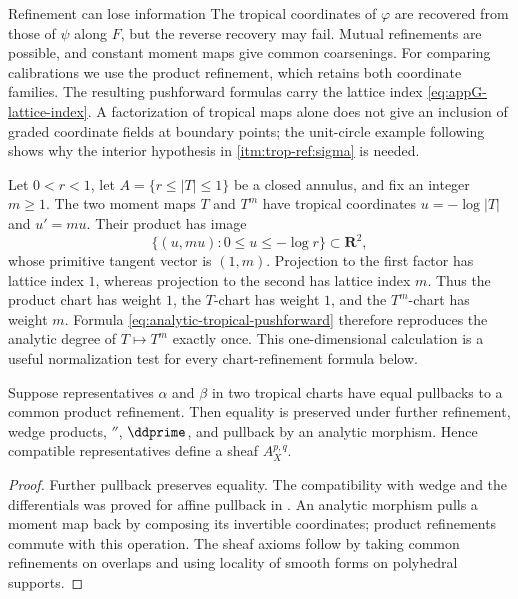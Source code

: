 \begin{warning}{Refinement can lose information}
The tropical coordinates of $\varphi$ are recovered from those of $\psi$
along $F$, but the reverse recovery may fail. Mutual refinements are
possible, and constant moment maps give common coarsenings. For comparing
calibrations we use the product refinement, which retains both coordinate
families. The resulting pushforward formulas carry the lattice index
\eqref{eq:appG-lattice-index}. A factorization of tropical maps alone does
not give an inclusion of graded coordinate fields at boundary points; the
unit-circle example following  shows why the
interior hypothesis in \cref{itm:trop-ref:sigma} is needed.
\end{warning}

\begin{example}
\label{ex:trop-common-refinement-index}
Let $0<r<1$, let $A=\{r\leq |T|\leq1\}$ be a closed annulus, and fix an integer
$m\geq1$.  The two moment maps $T$ and $T^m$ have tropical coordinates
$u=-\log|T|$ and $u'=mu$.  Their product has image
\[
             \{(u,mu):0\leq u\leq-\log r\}\subset\mathbf R^2,
\]
whose primitive tangent vector is $(1,m)$.  Projection to the first factor
has lattice index $1$, whereas projection to the second has lattice index
$m$.  Thus the product chart has weight $1$, the $T$-chart has weight $1$,
and the $T^m$-chart has weight $m$.  Formula
\eqref{eq:analytic-tropical-pushforward} therefore reproduces the analytic
degree of $T\mapsto T^m$ exactly once.  This one-dimensional calculation is
a useful normalization test for every chart-refinement formula below.
\end{example}

\begin{proposition}\label{prop:tropical-form-refinement}
Suppose representatives $\alpha$ and $\beta$ in two tropical charts have
equal pullbacks to a common product refinement. Then equality is preserved
under further refinement, wedge products, $\dprime$, $\ddprime$, and pullback by an
analytic morphism. Hence compatible representatives define a sheaf
$A_X^{p,q}$.
\end{proposition}
\begin{proof}
Further pullback preserves equality. The compatibility with wedge and the
differentials was proved for affine pullback in . An
analytic morphism pulls a moment map back by composing its invertible
coordinates; product refinements commute with this operation. The sheaf
axioms follow by taking common refinements on overlaps and using locality of
smooth forms on polyhedral supports.
\end{proof}

